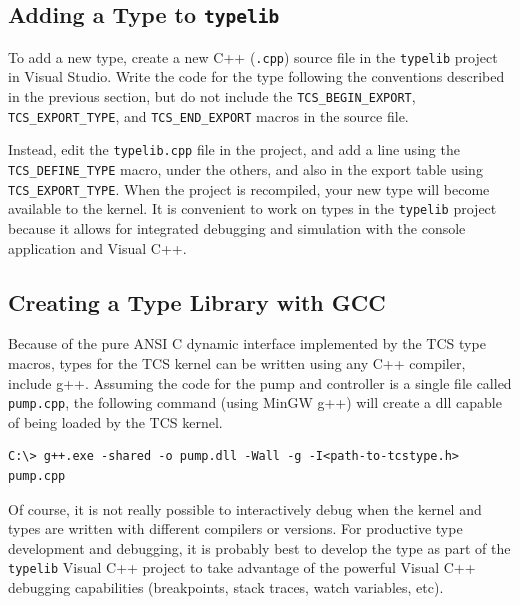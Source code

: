 \documentclass{article}
\begin{document}
\subsection{Adding a Type to \texttt{typelib}}

To add a new type, create a new C++ (\texttt{.cpp}) source file in the \texttt{typelib} project in Visual Studio.  Write the code for the type following the conventions described in the previous section, but do not include the \texttt{TCS\_BEGIN\_EXPORT}, \texttt{TCS\_EXPORT\_TYPE}, and \texttt{TCS\_END\_EXPORT} macros in the source file.

Instead, edit the \texttt{typelib.cpp} file in the project, and add a line using the \texttt{TCS\_DEFINE\_TYPE} macro, under the others, and also in the export table using \texttt{TCS\_EXPORT\_TYPE}.  When the project is recompiled, your new type will become available to the kernel.  It is convenient to work on types in the \texttt{typelib} project because it allows for integrated debugging and simulation with the console application and Visual C++.

\subsection{Creating a Type Library with GCC}

Because of the pure ANSI C dynamic interface implemented by the TCS type macros, types for the TCS kernel can be written using any C++ compiler, include g++.  Assuming the code for the pump and controller is a single file called \texttt{pump.cpp}, the following command (using MinGW g++) will create a dll capable of being loaded by the TCS kernel.  
\begin{verbatim}
C:\> g++.exe -shared -o pump.dll -Wall -g -I<path-to-tcstype.h> pump.cpp
\end{verbatim}
Of course, it is not really possible to interactively debug when the kernel and types are written with different compilers or versions.  For productive type development and debugging, it is probably best to develop the type as part of the \texttt{typelib} Visual C++ project to take advantage of the powerful Visual C++ debugging capabilities (breakpoints, stack traces, watch variables, etc).
\end{document}

